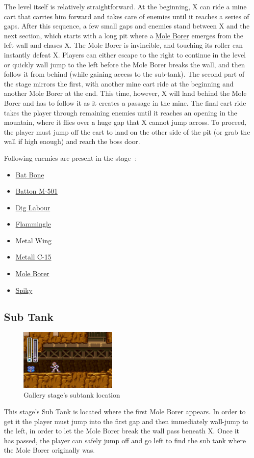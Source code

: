 The level itself is relatively straightforward. At the beginning, X can ride a mine cart that carries him forward and takes care of enemies until it reaches a series of gaps. After this sequence, a few small gaps and enemies stand between X and the next section, which starts with a long pit where a \hyperlink{miniboss:Mole_Borer}{Mole Borer} emerges from the left wall and chases X. The Mole Borer is invincible, and touching its roller can instantly defeat X. Players can either escape to the right to continue in the level or quickly wall jump to the left before the Mole Borer breaks the wall, and then follow it from behind (while gaining access to the sub-tank). The second part of the stage mirrors the first, with another mine cart ride at the beginning and another Mole Borer at the end. This time, however, X will land behind the Mole Borer and has to follow it as it creates a passage in the mine. The final cart ride takes the player through remaining enemies until it reaches an opening in the mountain, where it flies over a huge gap that X cannot jump across. To proceed, the player must jump off the cart to land on the other side of the pit (or grab the wall if high enough) and reach the boss door.

Following enemies are present in the stage~\cite{wiki:Gallery}:
\begin{itemize}
	\item \hyperlink{enem:Batton_Bone}{Bat Bone} 
	\item \hyperlink{enem:Batton_M-501}{Batton M-501} 
	\item \hyperlink{enem:Dig_Labour}{Dig Labour} 
	\item \hyperlink{enem:Flammingle}{Flammingle} 
	\item \hyperlink{enem:Metal_Wing}{Metal Wing} 
	\item \hyperlink{enem:Metall_C-15}{Metall C-15} 
	\item \hyperlink{miniboss:Mole_Borer}{Mole Borer}
	\item \hyperlink{enem:Spiky}{Spiky}
\end{itemize}

\subsection{Sub Tank}
\begin{figure}[htp]
	\centering
	\includegraphics[height=3cm]{figures/X1/Armored_armadillo/Armadillo_tank.jpg}
	\caption{Gallery stage's subtank location}
\end{figure}
This stage's Sub Tank is located where the first Mole Borer appears. In order to get it the player must jump into the first gap and then immediately wall-jump to the left, in order to let the Mole Borer break the wall pass beneath X. Once it has passed, the player can safely jump off and go left to find the sub tank where the Mole Borer originally was. 

